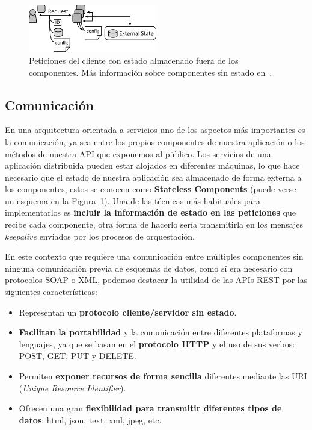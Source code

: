 \begin{figure}
\centering
\includegraphics[width=0.5\textwidth]{stateless.png}
\caption{\label{fig:scomm}Peticiones del cliente con estado almacenado fuera de los componentes. Más información sobre componentes sin estado en~\cite{sless}.}
\end{figure}

\subsection{Comunicación}\label{sec:intro}
En una arquitectura orientada a servicios uno de los aspectos más importantes es la comunicación, ya sea entre los propios componentes de nuestra aplicación o los métodos de nuestra API que exponemos al público. Los servicios de una aplicación distribuida pueden estar alojados en diferentes máquinas, lo que hace necesario que el estado de nuestra aplicación sea almacenado de forma externa a los componentes, estos se conocen como \textbf{Stateless Components}  (puede verse un esquema en la Figura~\ref{fig:scomm}). Una de las técnicas más habituales para implementarlos es \textbf{incluir la información de estado en las peticiones} que recibe cada componente, otra forma de hacerlo sería transmitirla en los mensajes \emph{keepalive} enviados por los procesos de orquestación.

En este contexto que requiere una comunicación entre múltiples componentes sin ninguna comunicación previa de esquemas de datos, como sí era necesario con protocolos SOAP o XML, podemos destacar la utilidad de las APIs REST por las siguientes características:

\begin{itemize}
\item Representan un \textbf{protocolo cliente/servidor sin estado}.
\item \textbf{ Facilitan la portabilidad} y la comunicación entre diferentes plataformas y lenguajes, ya que se basan en el \textbf{protocolo HTTP} y el uso de sus verbos: POST, GET, PUT y DELETE.
\item Permiten \textbf{exponer recursos de forma sencilla} diferentes  mediante las URI (\textit{Unique Resource Identifier}).
\item Ofrecen una gran \textbf{flexibilidad para transmitir diferentes tipos de datos}: html, json, text, xml, jpeg, etc.
\end{itemize}

